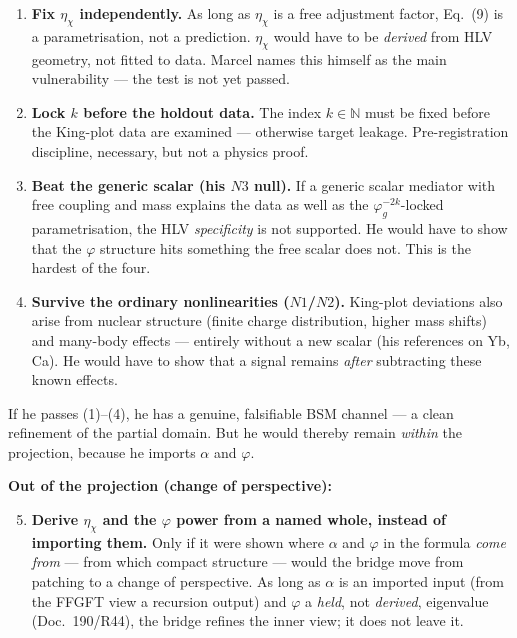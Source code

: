 \begin{enumerate}
  \item \textbf{Fix $\eta_\chi$ independently.} As long as $\eta_\chi$ is a
    free adjustment factor, Eq.~(9) is a parametrisation, not a prediction.
    $\eta_\chi$ would have to be \emph{derived} from HLV geometry, not fitted
    to data. Marcel names this himself as the main vulnerability --- the test
    is not yet passed.
  \item \textbf{Lock $k$ before the holdout data.} The index $k \in \mathbb{N}$
    must be fixed before the King-plot data are examined --- otherwise target
    leakage. Pre-registration discipline, necessary, but not a physics proof.
  \item \textbf{Beat the generic scalar (his $N3$ null).} If a generic scalar
    mediator with free coupling and mass explains the data as well as the
    $\varphi_g^{-2k}$-locked parametrisation, the HLV \emph{specificity} is not
    supported. He would have to show that the $\varphi$ structure hits
    something the free scalar does not. This is the hardest of the four.
  \item \textbf{Survive the ordinary nonlinearities ($N1$/$N2$).} King-plot
    deviations also arise from nuclear structure (finite charge distribution,
    higher mass shifts) and many-body effects --- entirely without a new scalar
    (his references on Yb, Ca). He would have to show that a signal remains
    \emph{after} subtracting these known effects.
\end{enumerate}

If he passes (1)--(4), he has a genuine, falsifiable BSM channel --- a clean
refinement of the partial domain. But he would thereby remain \emph{within} the
projection, because he imports $\alpha$ and $\varphi$.

\textbf{Out of the projection (change of perspective):}

\begin{enumerate}
  \setcounter{enumi}{4}
  \item \textbf{Derive $\eta_\chi$ and the $\varphi$ power from a named whole,
    instead of importing them.} Only if it were shown where $\alpha$ and
    $\varphi$ in the formula \emph{come from} --- from which compact structure
    --- would the bridge move from patching to a change of perspective. As long
    as $\alpha$ is an imported input (from the FFGFT view a recursion output)
    and $\varphi$ a \emph{held}, not \emph{derived}, eigenvalue (Doc.~190/R44),
    the bridge refines the inner view; it does not leave it.
\end{enumerate}


